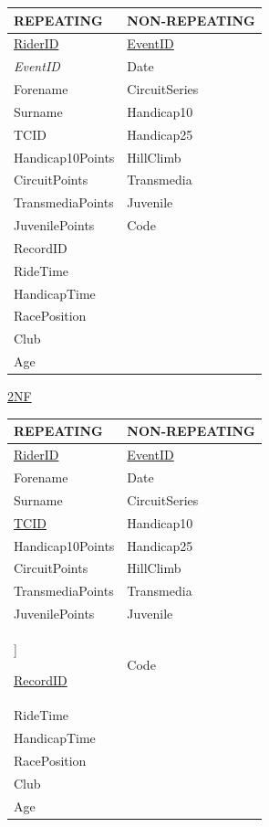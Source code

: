 \begin{tabular}{|l|l|}
\hline
REPEATING           & NON-REPEATING \\ \hline
\underline{RiderID} & \underline{EventID} \\ \hline
\emph{EventID}      & Date \\ \hline
Forename             & CircuitSeries \\ \hline 
Surname             & Handicap10 \\ \hline 
TCID                & Handicap25 \\ \hline
Handicap10Points    & HillClimb \\ \hline 
CircuitPoints       & Transmedia \\ \hline
TransmediaPoints    & Juvenile \\ \hline
JuvenilePoints      & Code \\ \hline
RecordID            & \\ \hline
RideTime            & \\ \hline
HandicapTime        & \\ \hline
RacePosition        & \\ \hline
Club                & \\ \hline
Age                 & \\ \hline

\end{tabular}

\underline{2NF}

\begin{tabular}{|l|l|}
\hline
REPEATING & NON-REPEATING \\ \hline
\underline{RiderID} & \underline{EventID} \\ \hline
Forename & Date \\ \hline
Surname & CircuitSeries \\ \hline 

\underline{TCID} & Handicap10 \\ \hline 
Handicap10Points & Handicap25 \\ \hline
CircuitPoints & HillClimb \\ \hline 
TransmediaPoints & Transmedia \\ \hline
JuvenilePoints & Juvenile \\ \hline]

\underline{RecordID} & Code \\ \hline
RideTime & \\ \hline
HandicapTime & \\ \hline
RacePosition & \\ \hline
Club & \\ \hline
Age & \\ \hline

\end{tabular}

